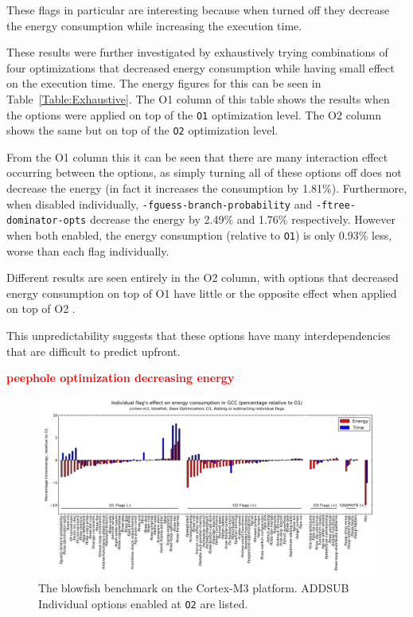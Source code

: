 \documentclass[twocolumn]{article}
\newcommand{\todo}[1]{\textbf{\textcolor{red}{#1}}}
\begin{document}
These flags in particular are interesting because when turned off they decrease the energy consumption while increasing the execution time.

These results were further investigated by exhaustively trying combinations of four optimizations that decreased energy consumption while having small effect on the execution time. The energy figures for this can be seen in Table~\ref{Table:Exhaustive}. The O1 column of this table shows the results when the options were applied on top of the \texttt{O1} optimization level. The O2 column shows the same but on top of the \texttt{O2} optimization level.

 From the O1 column this it can be seen that there are many interaction effect occurring between the options, as simply turning all of these options off does not decrease the energy (in fact it increases the consumption by 1.81\%). Furthermore, when disabled individually, \texttt{-fguess-branch-probability} and \texttt{-ftree-dominator-opts} decrease the energy by 2.49\% and 1.76\% respectively. However when both enabled, the energy consumption (relative to \texttt{O1}) is only 0.93\% less, worse than each flag individually.

Different results are seen entirely in the O2 column, with options that decreased energy consumption on top of O1 have little or the opposite effect when applied on top of O2
.

This unpredictability suggests that these options have many interdependencies that are difficult to predict upfront.

\todo{peephole optimization decreasing energy }

\begin{figure}[tb]
	\includegraphics[width=\linewidth]{cortex-m3/O1_addsub_blowfish.png}
	\caption{The blowfish benchmark on the Cortex-M3 platform. ADDSUB Individual options enabled at \texttt{O2} are listed.}
	\label{Fig:AddsubO1Blowfish}
\end{figure}
\end{document}
